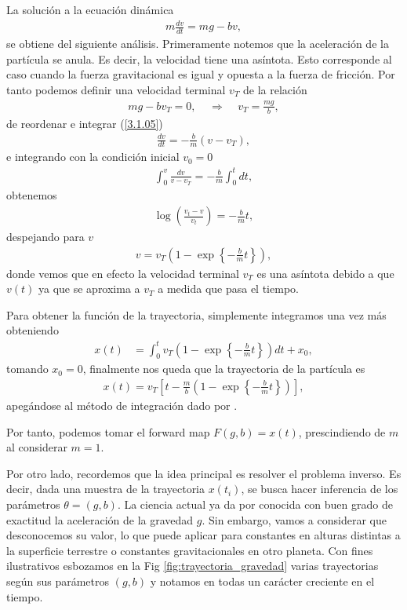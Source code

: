 La solución a la ecuación dinámica
\begin{align}
    m \frac{dv}{dt} = mg - bv,
    \label{3.1.05}
\end{align}
se obtiene del siguiente análisis. Primeramente notemos que la aceleración de la partícula se anula. Es decir, la velocidad tiene una asíntota. Esto corresponde al caso cuando la fuerza gravitacional es igual y opuesta a la fuerza de fricción. Por tanto podemos definir una velocidad terminal $v_T$ de la relación
\begin{align}
    mg - bv_T = 0, \:\:\:\:\: \Rightarrow \:\:\:\:\: v_T = \frac{mg}{b},
    \label{3.1.06}
\end{align}
de reordenar e integrar (\ref{3.1.05}) 
\begin{align}
    \frac{dv}{dt } = -\frac{b}{m}(v - v_T),
    \label{3.1.07}
\end{align}
e integrando con la condición inicial $v_0 = 0$
\begin{align*}
    \int_{0}^{v} \frac{dv}{v - v_T} = -\frac{b}{m} \int_{0}^{t} dt,
\end{align*}
obtenemos
\begin{align*}
    \log{\left ( \frac{v_t - v }{v_t} \right )} = -\frac{b}{m}t,
\end{align*}
despejando para $v$ 
\begin{align}
    v = v_T \left ( 1- \exp \left \{{-\frac{b}{m}t} \right\} \right ),
\end{align}
donde vemos que en efecto la velocidad terminal $v_T$ es una asíntota debido a que  $v(t)$ ya que se aproxima a $v_T$ a medida que pasa el tiempo. 

Para obtener la función de la trayectoria, simplemente integramos una vez más obteniendo
\begin{align*}
    x(t) &= \int_{0}^{t} v_T \left ( 1 - \exp \left \{-\frac{b}{m}t \right \} \right ) d t + x_0,
\end{align*}
tomando $x_0 = 0$, finalmente nos queda que la trayectoria de la partícula es
\begin{align}
    x(t) = v_T \left [ t - \frac{m}{b} \left( 1- \exp\left\{-\frac{b}{m} t\right\}\right)\right],
    \label{3.1.12}
\end{align}
apegándose al método de integración dado por \cite{sears1986fisica}.

Por tanto, podemos tomar el forward map $F(g,b) = x(t)$, prescindiendo de $m$ al considerar $m = 1$.

Por otro lado, recordemos que la idea principal es resolver el problema inverso. Es decir, dada una muestra de la trayectoria $x(t_i)$, se busca hacer inferencia de los parámetros $\theta = (g,b)$. La ciencia actual ya da por conocida con buen grado de exactitud la aceleración de la gravedad $g$. Sin embargo, vamos a considerar que desconocemos su valor, lo que puede aplicar para constantes en alturas distintas a la superficie terrestre o constantes gravitacionales en otro planeta. Con fines ilustrativos esbozamos en la Fig \ref{fig:trayectoria_gravedad} varias trayectorias según sus parámetros $(g,b)$ y notamos en todas un carácter creciente en el tiempo.

